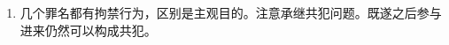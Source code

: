 \begin{enumerate}
\begin{enumerate}
\begin{enumerate}
                \end{enumerate}
          \item 收买被拐卖的妇女、儿童。没有出卖目的。
                \begin{enumerate}
                  \item 既遂。买到手。
                  \item 仙人跳。。
                \end{enumerate}
          \item 拐骗儿童。没有出卖目的。。
          \item \sjt 两个罪的罪数。原则犯收买/拐骗罪后犯任何罪都要数罪并罚。
                \begin{enumerate}
                  \item 实务却不是这样，判轻了。。
                  \item 例外。收买/拐骗 + 拐卖 = 拐卖。
                \end{enumerate}
        \end{enumerate}
  \item \yi 几个罪名都有拘禁行为，区别是主观目的。\er 注意承继共犯问题。既遂之后参与进来仍然可以构成共犯。
\end{enumerate}
